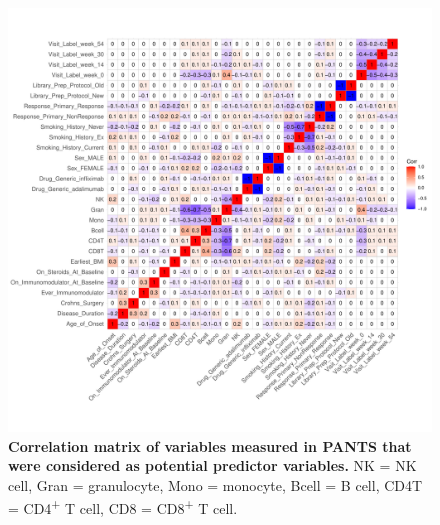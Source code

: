 \begin{figure}
    \centering
    \includegraphics[width=1.0\textwidth,page=1]{mainmatter/figures/chapter_04/process_pheno.pheno_filtered_dge.ggcorrplot.pdf}
    \caption{
        \textbf{Correlation matrix of variables measured in \gls{PANTS} that were considered as potential predictor variables.}
        NK = \gls{NK} cell, Gran = granulocyte, Mono = monocyte, Bcell = B cell, CD4T = CD4\textsuperscript{+} T cell, CD8 = CD8\textsuperscript{+} T cell.
    }
    \label{fig:multipants_pheno_filtered_ggcorrplot}
\end{figure}



